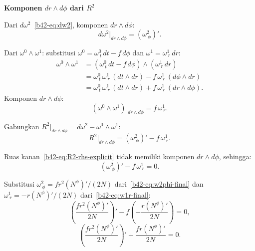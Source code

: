 \vspace{0.5em}
\noindent \textbf{Komponen $dr \wedge d\phi$ dari $R^2$}

Dari $d\omega^2$~\eqref{b42-eq:dw2}, komponen $dr \wedge d\phi$:
\begin{equation}
    d\omega^2\big|_{dr \wedge d\phi} = (\omega^2_{\ \phi})'. \label{b42-eq:dw2-rphi}
\end{equation}

\noindent Dari $\omega^0 \wedge \omega^1$: substitusi $\omega^0 = \omega^0_{\ t}\,dt - f\,d\phi$ dan $\omega^1 = \omega^1_{\ r}\,dr$:
\begin{align}
    \omega^0 \wedge \omega^1 &= (\omega^0_{\ t}\,dt - f\,d\phi) \wedge (\omega^1_{\ r}\,dr) \nonumber\\[4pt]
    &= \omega^0_{\ t}\,\omega^1_{\ r}\,(dt \wedge dr) - f\,\omega^1_{\ r}\,(d\phi \wedge dr) \nonumber\\[4pt]
    &= \omega^0_{\ t}\,\omega^1_{\ r}\,(dt \wedge dr) + f\,\omega^1_{\ r}\,(dr \wedge d\phi).
\end{align}
Komponen $dr \wedge d\phi$:
\begin{equation}
    (\omega^0 \wedge \omega^1)\big|_{dr \wedge d\phi} = f\,\omega^1_{\ r}. \label{b42-eq:w0w1-rphi}
\end{equation}

\noindent Gabungkan $R^2\big|_{dr \wedge d\phi} = d\omega^2 - \omega^0 \wedge \omega^1$:
\begin{equation}
    R^2\big|_{dr \wedge d\phi} = (\omega^2_{\ \phi})' - f\,\omega^1_{\ r}. \label{b42-eq:R2-rphi-lhs}
\end{equation}

Ruas kanan~\eqref{b42-eq:R2-rhs-explicit} tidak memiliki komponen $dr \wedge d\phi$, sehingga:
\begin{equation}
    (\omega^2_{\ \phi})' - f\,\omega^1_{\ r} = 0. \label{b42-eq:R2-rphi-eqn}
\end{equation}

Substitusi $\omega^2_{\ \phi} = fr^2(N^\phi)'/(2N)$ dari~\eqref{b42-eq:w2phi-final} dan $\omega^1_{\ r} = -r(N^\phi)'/(2N)$ dari~\eqref{b42-eq:w1r-final}:
\begin{equation}
    \left(\frac{fr^2(N^\phi)'}{2N}\right)' - f\!\left(-\frac{r(N^\phi)'}{2N}\right) = 0,
\end{equation}
\begin{equation}
    \left(\frac{fr^2(N^\phi)'}{2N}\right)' + \frac{fr(N^\phi)'}{2N} = 0. \label{b42-eq:Nphi-ODE-general}
\end{equation}

